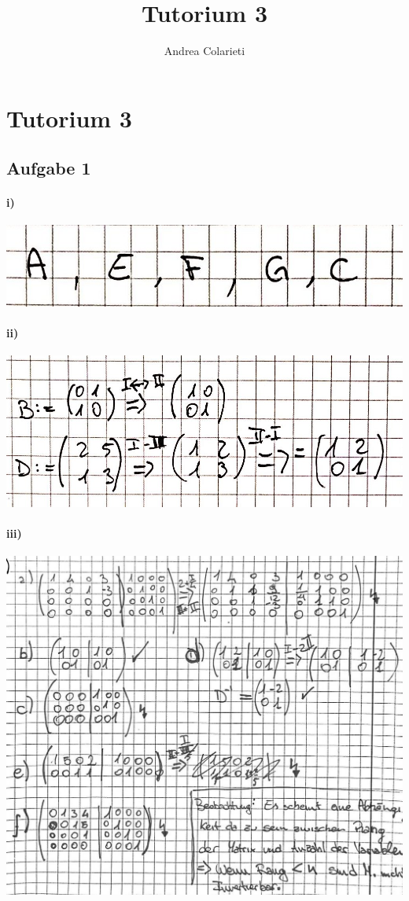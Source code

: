 \documentclass[10pt,a4paper]{article}
\author{Andrea Colarieti}
\title{Tutorium 3}
\begin{document}
\section{Tutorium 3}

\subsection{Aufgabe 1}
\paragraph{i)} 
\includegraphics[scale=0.2]{1.jpg} 
\paragraph{ii)}
\includegraphics[scale=0.2]{2.jpg} 
\paragraph{iii)}
\includegraphics[scale=0.2]{3.jpg} 
\end{document}
